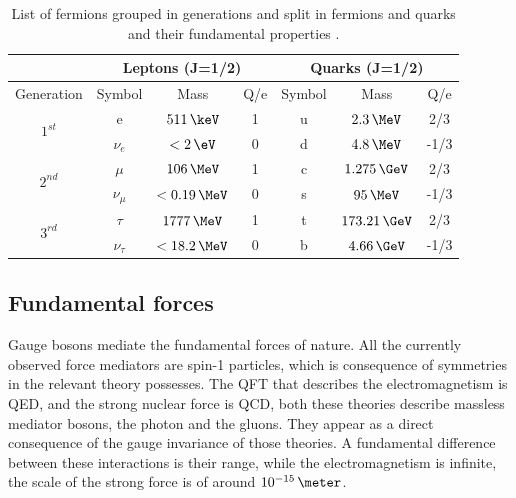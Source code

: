 \begin{table}[!htb]
\centering
\begin{tabular}{|c||c|c|c||c|c|c|}
\hline
 & \multicolumn{3}{c||}{Leptons (J=1/2)} & \multicolumn{3}{c|}{Quarks (J=1/2)} \\
\hline
Generation                &     Symbol &            Mass & Q/e & Symbol &           Mass & Q/e \\
\hline\hline
\multirow{2}{*}{$1^{st}$} & e          &     $511\,\keV$ &   1 &      u &    $2.3\,\MeV$ &  2/3 \\
                          & $\nu_e$    &     $< 2\, \eV$ &   0 &      d &    $4.8\,\MeV$ & -1/3 \\
\hline
\hline
\multirow{2}{*}{$2^{nd}$} & $\mu$      &  $   106\,\MeV$ &   1 &      c &  $1.275\,\GeV$ &  2/3 \\
                          & $\nu_\mu$  &  $< 0.19\,\MeV$ &   0 &      s &     $95\,\MeV$ & -1/3 \\
\hline
\hline
\multirow{2}{*}{$3^{rd}$} & $\tau$     & $   1777\,\MeV$ &   1 &      t & $173.21\,\GeV$ &  2/3 \\
                          & $\nu_\tau$ & $< 18.2 \,\MeV$ &   0 &      b &   $4.66\,\GeV$ & -1/3 \\
\hline
\end{tabular}
\caption[List of leptons and their fundamental properties]{List of fermions grouped in generations and split in fermions and quarks and their fundamental properties \cite{ARTICLE:PDG2014}.}
\label{TABLE:Theory_SM_ParticlesAndForces_MatterParticle}
\end{table}

\subsection{Fundamental forces}
\label{SUBSECTION:Theory_SM_FundamentalForces}


Gauge bosons mediate the fundamental forces of nature. All the currently observed force mediators are spin-1 particles, which is consequence of symmetries in the relevant theory possesses. The \gls{QFT} that describes the electromagnetism is \gls{QED}, and the strong nuclear force is \gls{QCD}, both these theories describe massless mediator bosons, the photon and the gluons. They appear as a direct consequence of the gauge invariance of those theories. A fundamental difference between these interactions is their range, while the electromagnetism is infinite, the scale of the strong force is of around $10^{-15}\,\meter$.

